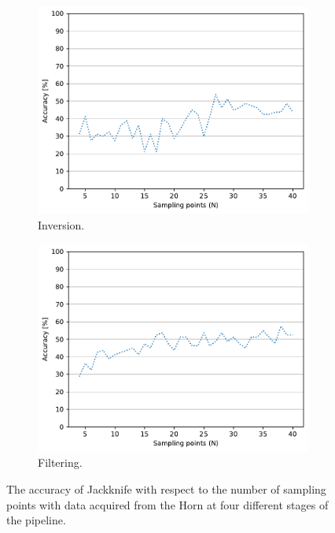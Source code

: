 \begin{figure}[tbp]
    \begin{subfigure}{.49\textwidth}
        \centering
        \includegraphics[width=.99\linewidth]{Figures/RadarExperiments/Datasets/SensorsComparison/Horn/samples-inversion.pdf}
        \vspace{-15pt}
        \captionsetup{width=.99\linewidth}
        \caption{Inversion.}
        \label{fig:radar-experiments:sensors:horn-samples:inversion}
    \end{subfigure}
    \begin{subfigure}{.49\textwidth}
        \centering
        \includegraphics[width=.99\linewidth]{Figures/RadarExperiments/Datasets/SensorsComparison/Horn/samples-filtering.pdf}
        \vspace{-15pt}
        \captionsetup{width=.99\linewidth}
        \caption{Filtering.}
        \label{fig:radar-experiments:sensors:horn-samples:filtering}
    \end{subfigure}
    
    \vspace{-6pt}
    \caption{The accuracy of Jackknife with respect to the number of sampling points with data acquired from the Horn at four different stages of the pipeline.}
    \label{fig:radar-experiments:sensors:horn-samples}
\end{figure}

